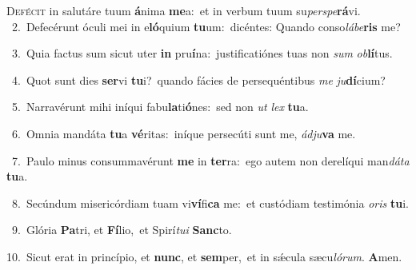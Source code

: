 \lettrine{\initial\textcolor{\initialcolor}{D}}{efécit} in salutáre tuum \textbf{á}\-nima \textbf{me}\-a:~\star et in verbum tuum su\-\textit{per}\-\textit{spe}\textbf{rá}vi.\\
{\numbfont\textcolor{\numbcolor}{~2.}}~Defecérunt óculi mei in e\-\textbf{ló}\-quium \textbf{tu}\-um:~\star dicéntes: Quando conso\-\textit{lá}\-\textit{be}\textbf{ris} me?\par
{\numbfont\textcolor{\numbcolor}{~3.}}~Quia factus sum sicut uter \textbf{in} pru\-\textbf{í}\-na:~\star justificatiónes tuas non \textit{sum} \textit{ob}\-\textbf{lí}tus.\par
{\numbfont\textcolor{\numbcolor}{~4.}}~Quot sunt dies \textbf{ser}\-vi \textbf{tu}\-i?~\star quando fácies de persequéntibus \textit{me} \textit{ju}\-\textbf{dí}cium?\par
{\numbfont\textcolor{\numbcolor}{~5.}}~Narravérunt mihi iníqui fabu\-\textbf{la}\-ti\-\textbf{ó}\-nes:~\star sed non \textit{ut} \textit{lex} \textbf{tu}\-a.\par
{\numbfont\textcolor{\numbcolor}{~6.}}~Omnia mandáta \textbf{tu}\-a \textbf{vé}\-ritas:~\star iníque persecúti sunt me, \textit{ád}\-\textit{ju}\textbf{va} me.\par
{\numbfont\textcolor{\numbcolor}{~7.}}~Paulo minus consummavérunt \textbf{me} in \textbf{ter}\-ra:~\star ego autem non derelíqui man\-\textit{dá}\-\textit{ta} \textbf{tu}\-a.\par
{\numbfont\textcolor{\numbcolor}{~8.}}~Secúndum misericórdiam tuam vi\-\textbf{ví}\-fi\textbf{ca} me:~\star et custódiam testimónia \textit{o}\-\textit{ris} \textbf{tu}\-i.\par
{\numbfont\textcolor{\numbcolor}{~9.}}~Glória \textbf{Pa}\-tri, et \textbf{Fí}\-lio,~\star et Spirí\-\textit{tu}\-\textit{i} \textbf{Sanc}\-to.\par
{\numbfont\textcolor{\numbcolor}{10.}}~Sicut erat in princípio, et \textbf{nunc}\-, et \textbf{sem}\-per,~\star et in sǽcula sæcu\-\textit{ló}\-\textit{rum}. \textbf{A}\-men.\par
